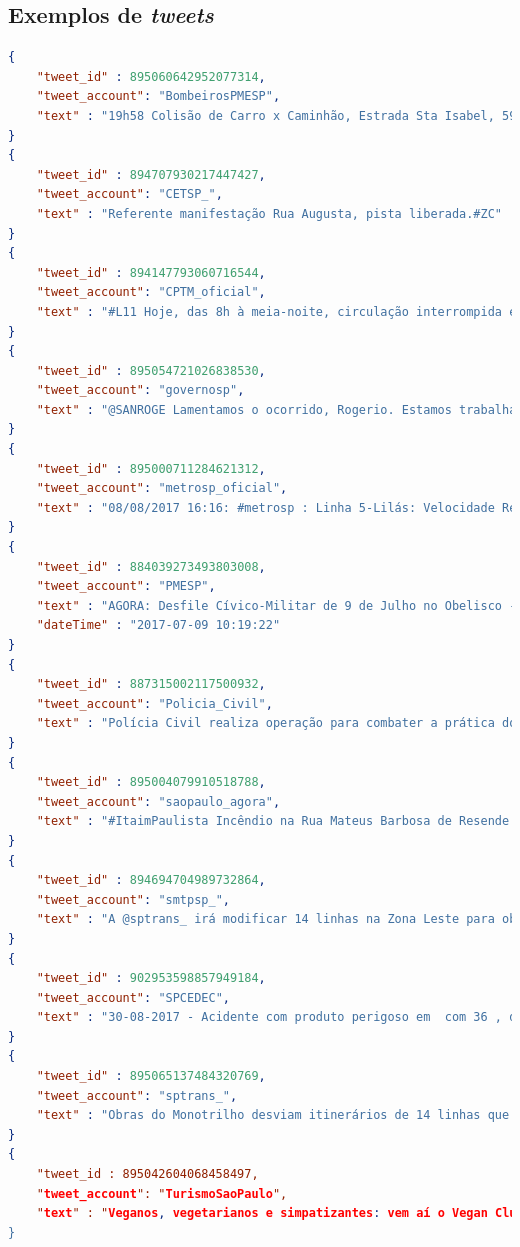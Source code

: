 \documentclass[
	12pt,				%
	oneside,			%
	a4paper,			%
	english,			%
	brazil				%
	]{abntex2ppgsi}
\begin{document}
\begin{apendicesenv}

\partapendices
\chapter{Exemplos de \textit{tweets}}
\label{apendiceA}

\begin{lstlisting}[language=json,title=Exemplos de \textit{tweets} dos \textit{profiles} selecionados citados na tabela \ref{tab:oficialProfiles}, label=tweetsSample]
{
    "tweet_id" : 895060642952077314,
    "tweet_account": "BombeirosPMESP",
    "text" : "19h58 Colisão de Carro x Caminhão, Estrada Sta Isabel, 5950 Itaquaquecetuba. 2 Vítimas, 1 Vtr. Aguardando maiores informes"
}
{
    "tweet_id" : 894707930217447427,
    "tweet_account": "CETSP_",
    "text" : "Referente manifestação Rua Augusta, pista liberada.#ZC"
}
{
    "tweet_id" : 894147793060716544,
    "tweet_account": "CPTM_oficial",
    "text" : "#L11 Hoje, das 8h à meia-noite, circulação interrompida entre Luz e Brás. P/ seguir viagem, use a L7-Rubi q prestará serviço até a Est. Brás"
}
{
    "tweet_id" : 895054721026838530,
    "tweet_account": "governosp",
    "text" : "@SANROGE Lamentamos o ocorrido, Rogerio. Estamos trabalhando continuamente para melhorar a segurança na região. Entre maio e junho, [+] [1]"
}
{
    "tweet_id" : 895000711284621312,
    "tweet_account": "metrosp_oficial",
    "text" : "08/08/2017 16:16: #metrosp : Linha 5-Lilás: Velocidade Reduzida. Mais informações em https://t.co/CaeqD26iJR"
}
{
    "tweet_id" : 884039273493803008,
    "tweet_account": "PMESP",
    "text" : "AGORA: Desfile Cívico-Militar de 9 de Julho no Obelisco - Ibirapuera SP, transmissão ao vivo na página oficial Facebook da Polícia Militar.",
    "dateTime" : "2017-07-09 10:19:22"
}
{
    "tweet_id" : 887315002117500932,
    "tweet_account": "Policia_Civil",
    "text" : "Polícia Civil realiza operação para combater a prática do Jogo conhecido como "Baleia Azul"... https://t.co/kh2HW6UZvT",
}
{
    "tweet_id" : 895004079910518788,
    "tweet_account": "saopaulo_agora",
    "text" : "#ItaimPaulista Incêndio na Rua Mateus Barbosa de Resende nº 235. Defesa Civil Regional acionada para o local. (CCOI) #spagora"
}
{
    "tweet_id" : 894694704989732864,
    "tweet_account": "smtpsp_",
    "text" : "A @sptrans_ irá modificar 14 linhas na Zona Leste para obras no Monotrilho Saiba mais: https://t.co/fCA0T7WCSY"
}
{
    "tweet_id" : 902953598857949184,
    "tweet_account": "SPCEDEC",
    "text" : "30-08-2017 - Acidente com produto perigoso em  com 36 , deixa 21 vítimas feridas e 02 ."
}
{
    "tweet_id" : 895065137484320769,
    "tweet_account": "sptrans_",
    "text" : "Obras do Monotrilho desviam itinerários de 14 linhas que atendem a Av. Sapopemba entre 5 e 11/08, das 23h às 5h: https://t.co/jH4LFgrSKZ"
}
{
    "tweet_id : 895042604068458497,
    "tweet_account": "TurismoSaoPaulo",
    "text" : "Veganos, vegetarianos e simpatizantes: vem aí o Vegan Club, em 12/08, no Centro de SP! #crueltyfree #veganfood... https://t.co/7f7ggr4vn4"
}
\end{lstlisting}


\end{apendicesenv}
\end{document}
